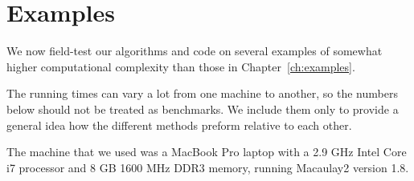 \documentclass[fleqn,reqno]{amsart}
\begin{document}
\section{Examples}
\label{sec:long-examples}

\begin{paragraf*}
We now field-test our algorithms and code on several examples of
somewhat higher computational complexity than those in Chapter~\ref{ch:examples}.

The running times can vary a lot from one machine to another,
so the numbers below should not be treated as benchmarks.
We include them only to provide a general idea how the different methods preform
relative to each other.

The machine that we used was a MacBook Pro laptop with
a 2.9 GHz Intel Core i7 processor and 8 GB 1600 MHz DDR3 memory,
running Macaulay2 version 1.8.
\end{paragraf*}
\end{document}
